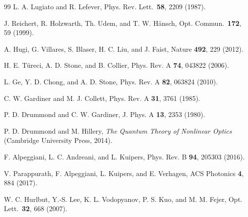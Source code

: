 \documentclass[12pt]{article}
\begin{document}
\begin{thebibliography}{99}
L. A. Lugiato and R. Lefever,
Phys. Rev. Lett.\ \textbf{58}, 2209 (1987).

J. Reichert, R. Holzwarth, Th. Udem, and T. W. H\"{a}nsch,
Opt. Commun.\ \textbf{172}, 59 (1999).

A. Hugi, G. Villares, S. Blaser, H. C. Liu, and J. Faist,
Nature \textbf{492}, 229 (2012).

H. E. T\"{u}reci, A. D. Stone, and B. Collier,
Phys. Rev. A \textbf{74}, 043822 (2006).

L. Ge, Y. D. Chong, and A. D. Stone,
Phys. Rev. A \textbf{82}, 063824 (2010).

C. W. Gardiner and M. J. Collett,
Phys. Rev. A \textbf{31}, 3761 (1985).

P. D. Drummond and C. W. Gardiner,
J. Phys. A \textbf{13}, 2353 (1980).

P. D. Drummond and M. Hillery,
\textit{The Quantum Theory of Nonlinear Optics}
(Cambridge University Press, 2014).

F. Alpeggiani, L. C. Andreani, and L. Kuipers,
Phys. Rev. B \textbf{94}, 205303 (2016).

V. Parappurath, F. Alpeggiani, L. Kuipers, and E. Verhagen,
ACS Photonics \textbf{4}, 884 (2017).

W. C. Hurlbut, Y.-S. Lee, K. L. Vodopyanov, P. S. Kuo, and M. M. Fejer,
Opt. Lett.\ \textbf{32}, 668 (2007).

\end{thebibliography}
\end{document}
